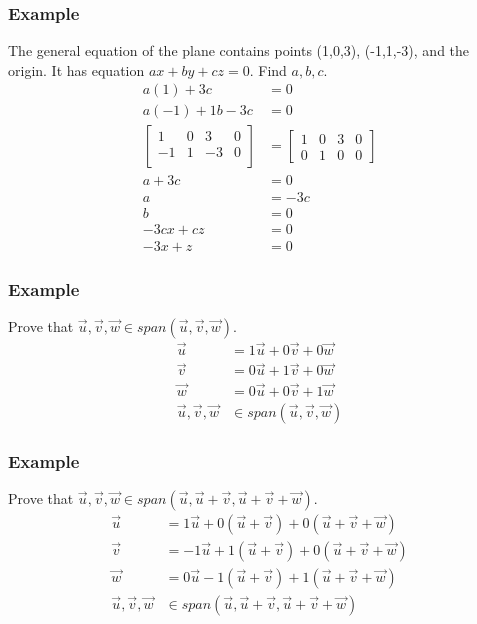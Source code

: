 \documentclass{math}
\begin{document}
\subsubsection*{Example}
The general equation of the plane contains points (1,0,3), (-1,1,-3), and the
origin. It has equation \( ax+by+cz = 0 \). Find \( a,b,c \).
\begin{align*}
  a(1)+3c &= 0 \\
  a(-1)+1b-3c &= 0 \\
  \left[\begin{array}{ccc|c}
    1 & 0 & 3 & 0 \\
    -1 & 1 & -3 & 0 \\
  \end{array}\right] &= \left[\begin{array}{ccc|c}
    1 & 0 & 3 & 0 \\
    0 & 1 & 0 & 0
  \end{array}\right] \\
  a+3c &= 0 \\
  a &= -3c \\
  b &= 0 \\
  -3cx+cz &= 0 \\
  -3x+z &= 0
\end{align*}

\subsubsection*{Example}
Prove that \( \vec{u},\vec{v},\vec{w}\in span(\vec{u},\vec{v},\vec{w}) \).
\begin{align*}
  \vec{u} &= 1\vec{u}+0\vec{v}+0\vec{w} \\
  \vec{v} &= 0\vec{u}+1\vec{v}+0\vec{w} \\
  \vec{w} &= 0\vec{u}+0\vec{v}+1\vec{w} \\
  \vec{u},\vec{v},\vec{w} &\in span(\vec{u},\vec{v},\vec{w})
\end{align*}

\subsubsection*{Example}
Prove that \( \vec{u},\vec{v},\vec{w}\in span(\vec{u},\vec{u}+\vec{v},\vec{u}+
\vec{v}+\vec{w}) \).
\begin{align*}
  \vec{u} &= 1\vec{u}+0(\vec{u}+\vec{v})+0(\vec{u}+\vec{v}+\vec{w}) \\
  \vec{v} &= -1\vec{u}+1(\vec{u}+\vec{v})+0(\vec{u}+\vec{v}+\vec{w}) \\
  \vec{w} &= 0\vec{u}-1(\vec{u}+\vec{v})+1(\vec{u}+\vec{v}+\vec{w}) \\
  \vec{u},\vec{v},\vec{w} &\in
    span(\vec{u},\vec{u}+\vec{v},\vec{u}+\vec{v}+\vec{w})
\end{align*}
\end{document}
